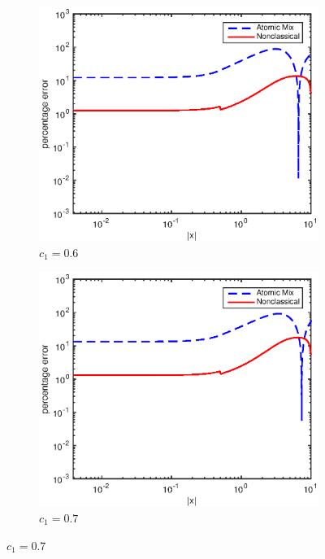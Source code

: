 \documentclass[12pt]{article}
\begin{document}
{\begin{figure}[p]
    \centering
    \begin{subfigure}{0.495\textwidth}
        \centering
        \includegraphics[width=\textwidth]{NSE_err_E60.eps}
        \caption{$c_1 = 0.6$}
        \label{figerrE60}
    \end{subfigure}
    \hfill
    \begin{subfigure}{0.495\textwidth}
        \centering
        \includegraphics[width=\textwidth]{NSE_err_E70.eps}
        \caption{$c_1 = 0.7$}

\end{subfigure}
\end{figure}}
\end{document}
